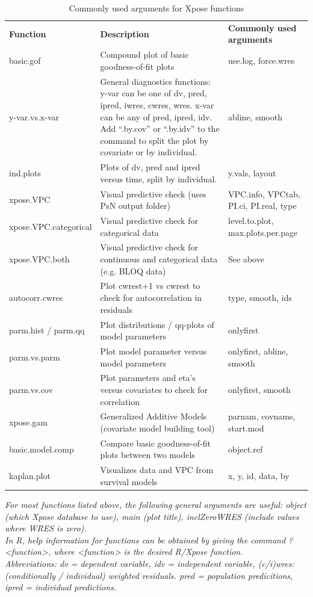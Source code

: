 \begin{landscape}
\begin{table}[ht]
\caption{Commonly used arguments for Xpose functions}
\vspace{10pt}
\footnotesize
\begin{tabular}{ p{3.1cm} p{9cm} p{4.5cm}}
\textbf{Function} & \textbf{Description} & \textbf{Commonly used arguments} \\ 
basic.gof & Compound plot of basic goodness-of-fit plots & use.log, force.wres\\
y-var.vs.x-var & General diagnostics functions: y-var can be one of dv, pred, ipred, iwres, cwres, wres. x-var can be any of pred, ipred, idv. Add “.by.cov” or “.by.idv” to the command to split the plot by covariate or by individual. & abline, smooth\\
ind.plots & Plots of dv, pred and ipred versus time, split by individual. & y.vals, layout\\
xpose.VPC & Visual predictive check (uses PsN output folder) & VPC.info, VPCtab, PI.ci, PI.real, type\\
xpose.VPC.categorical & Visual predictive check for categorical data & level.to.plot, max.plots.per.page\\
xpose.VPC.both & Visual predictive check for continuous and categorical data (e.g. BLOQ data) & See above\\
autocorr.cwres & Plot cwrest+1 vs cwrest to check for autocorrelation in residuals & type, smooth, ids\\
parm.hist / parm.qq & Plot distributions / qq-plots of model parameters & onlyfirst\\
parm.vs.parm & Plot model parameter versus model parameters & onlyfirst, abline, smooth\\
parm.vs.cov & Plot parameters and eta’s versus covariates to check for correlation & onlyfirst, smooth\\
xpose.gam & Generalized Additive Models (covariate model building tool) & parnam, covnams, start.mod\\
basic.model.comp & Compare basic goodness-of-fit plots between two models & object.ref\\
kaplan.plot & Visualizes data and VPC from survival models & x, y, id, data, by \\
\end{tabular}

\bigskip

\textit{
\noindent For most functions listed above, the following general arguments are useful: object (which Xpose database to use), main (plot title), inclZeroWRES (include values where WRES is zero).\\
\noindent In R, help information for functions can be obtained by giving the command ?<function>, where <function> is the  desired R/Xpose function. \\
\noindent Abbreviations: dv = dependent variable, idv = independent variable, (c/i)wres: (conditionally / individual) weighted residuals. pred = population predicitions, ipred = individual predictions.
}
\end{table}
\end{landscape}

